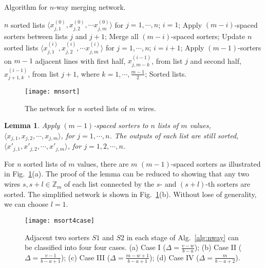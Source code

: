 \documentclass[10pt,journal,cspaper,compsoc]{IEEEtran}
\newtheorem{lemma}{Lemma}[section]
\begin{document}
\begin{algorithm}[!tp]
  \caption{Algorithm for $n$-way merging network.}
  \begin{algorithmic}
    \REQUIRE $n$ sorted lists $\langle x^{(0)}_{j,1}, x^{(0)}_{j,2}, \cdots x^{(0)}_{j,m} \rangle$ for $j=1,\cdots,n$;
    \STATE $i=1$;
            \STATE Apply $(m-i)$-spaced sorters between lists $j$ and $j+1$;
        \ENDFOR
        \STATE Merge all $(m-i)$-spaced sorters;
        \STATE Update $n$ sorted lists $\langle x^{(i)}_{j,1}, x^{(i)}_{j,2}, \cdots x^{(i)}_{j,m} \rangle$ for $j = 1, \cdots, n$;
        \STATE $i = i+1$;
    \ENDWHILE
        \STATE Apply $(m-1)$-sorters on $m-1$ adjacent lines with first half, $x^{(i-1)}_{j,m-k}$, from list $j$ and second half, $x^{(i-1)}_{j+1,k}$, from list $j+1$, where $k=1,\cdots,\frac{m-1}{2}$;
    \ENDFOR
\RETURN Sorted lists.
  \end{algorithmic}
  \label{alg:nway}
\end{algorithm}


\begin{figure}[!t]
\centering
\texttt{[image: mnsort]}
\caption{The network for $n$ sorted lists of $m$ wires.}
\label{fig:mnsort}
\end{figure}



\begin{lemma}
  Apply $(m-1)$-spaced sorters to $n$ lists of $m$ values, $\langle x_{j,1}, x_{j,2}, \cdots, x_{j,m} \rangle$, for $j=1,\cdots,n$. The outputs of each list are still sorted, $\langle  x'_{j,1}, x'_{j,2}, \cdots, x'_{j,m} \rangle$, for $j=1,2,\cdots,n$.
\label{lm:subgroupsort}
\end{lemma}
For $n$ sorted lists of $m$ values, there are $m$ $(m-1)$-spaced sorters as illustrated in Fig.~\ref{fig:mnsort}(a). The proof of the lemma can be reduced to showing that any two wires $s, s+l \in \mathbb{Z}_m$ of each list connected by the $s$- and $(s+l)$-th sorters are sorted. The simplified network is shown in Fig.~\ref{fig:mnsort}(b). Without lose of generality, we can choose $l=1$.

\begin{figure*}[!t]
\centering
\texttt{[image: msort4case]}
\caption{Adjacent two sorters $S1$ and $S2$ in each stage of Alg.~\ref{alg:nway} can be classified into four four cases. (a) Case I ($\Delta = \frac{v-w}{b-a}$); (b) Case II ($\Delta = \frac{v-1}{b-a+1}$); (c) Case III ($\Delta = \frac{m-w+1}{b-a+1}$); (d) Case IV ($\Delta = \frac{m}{b-a+2}$).}
\label{fig:m2sort}
\end{figure*}
\end{document}
